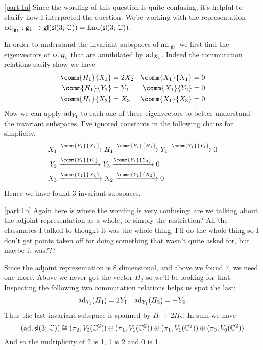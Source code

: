 \documentclass[
	pages,
	boxes,
	color=WildStrawberry
]{homework}
\begin{document}
\begin{solution}
	\ref{part:1a}
	Since the wording of this question is quite confusing, it's helpful to clarify how I interpreted the question. We're working with the representation $\operatorname{ad}\!|_{\mathsf{g}_1}:\mathsf{g}_1\to\mathsf{gl}(\mathsf{sl}(3;\, \mathbb{C})) = \operatorname{End}(\mathsf{sl}(3;\, \mathbb{C}))$.

	In order to understand the invariant subspaces of $\operatorname{ad}\!|_{\mathsf{g}_1}$ we first find the eigenvectors of $\operatorname{ad}_{H_1}$ that are annihilated by $\operatorname{ad}_{X_1}$. Indeed the commutation relations easily show we have
	\begin{align*}
		\comm{H_1}{X_1} & = 2X_2 & \comm{X_1}{X_1} & = 0 \\
		\comm{H_1}{Y_2} & = Y_2  & \comm{X_1}{Y_2} & = 0 \\
		\comm{H_1}{X_3} & = X_3  & \comm{X_1}{X_3} & = 0
	\end{align*}
	Now we can apply $\operatorname{ad}_{Y_1}$ to each one of these eigenvectors to better understand the invariant subspaces. I've ignored constants in the following chains for simplicity.
	\begin{align*}
		X_1 & \xrightarrow{\comm{Y_1}{X_1}} H_1 \xrightarrow{\comm{Y_1}{H_1}}Y_1 \xrightarrow{\comm{Y_1}{Y_1}} 0 \\
		Y_2 & \xrightarrow{\comm{Y_1}{Y_2}} Y_3 \xrightarrow{\comm{Y_1}{Y_3}} 0                                  \\
		X_3 & \xrightarrow{\comm{Y_1}{X_3}} X_2 \xrightarrow{\comm{Y_1}{X_2}} 0                                  \\
	\end{align*}
	Hence we have found 3 invariant subspaces.

	\ref{part:1b}
	Again here is where the wording is very confusing: are we talking about the adjoint representation as a whole, or simply the restriction? All the classmates I talked to thought it was the whole thing. I'll do the whole thing so I don't get points taken off for doing something that wasn't quite asked for, but maybe it was???

	Since the adjoint representation is 8 dimensional, and above we found 7, we need one more. Above we never got the vector $H_2$ so we'll be looking for that. Inspecting the following two commutation relations helps us spot the last:
	\begin{align*}
		\operatorname{ad}_{Y_1}(H_1) = 2Y_1 &  & \operatorname{ad}_{Y_1}(H_2) = -Y_2.
	\end{align*}
	Thus the last invariant subspace is spanned by $H_1 + 2H_2$. In sum we have
	\begin{equation*}
		(\operatorname{ad}, \mathsf{sl}(3;\, \mathbb{C}))\cong (\pi_2, V_2(\mathbb{C}^2))\oplus (\pi_1, V_1(\mathbb{C}^2)) \oplus (\pi_1, V_1(\mathbb{C}^2)) \oplus (\pi_0, V_0(\mathbb{C}^2))
	\end{equation*}
	And so the multiplicity of 2 is 1, 1 is 2 and 0 is 1.
\end{solution}
\end{document}
